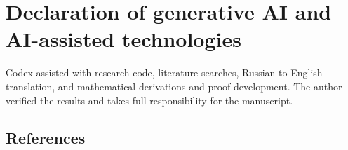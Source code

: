 \documentclass[ejs]{imsart}
\begin{document}
\section*{Declaration of generative AI and AI-assisted technologies}\label{declaration-of-generative-ai-and-ai-assisted-technologies}

Codex assisted with research code, literature searches,
Russian-to-English translation, and mathematical derivations and proof
development. The author verified the results and takes full
responsibility for the manuscript.

\subsection*{References}\label{references}
\end{document}
